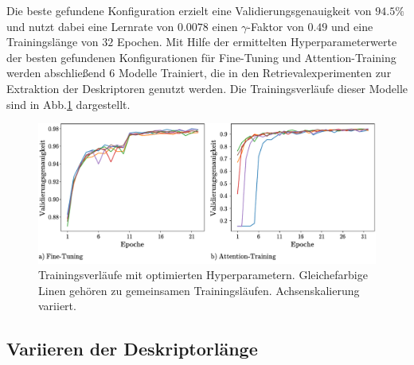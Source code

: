 Die beste gefundene Konfiguration erzielt eine Validierungsgenauigkeit von $94.5\%$ und nutzt dabei eine Lernrate von $0.0078$ einen $\gamma$-Faktor von $0.49$ und eine Trainingslänge von $32$ Epochen. 
Mit Hilfe der ermittelten Hyperparameterwerte der besten gefundenen Konfigurationen für Fine-Tuning und Attention-Training werden abschließend $6$ Modelle Trainiert, die in den Retrievalexperimenten zur Extraktion der Deskriptoren genutzt werden. Die Trainingsverläufe dieser Modelle sind in Abb.\ref{optimized_runs} dargestellt.
\begin{figure}[h]
\includegraphics[scale=0.75]{NNOPT/6_model_verlauf}
\caption{Trainingsverläufe mit optimierten Hyperparametern. Gleichefarbige Linen gehören zu gemeinsamen Trainingsläufen. Achsenskalierung variiert.}
\label{optimized_runs}
\end{figure}

\subsection{Variieren der Deskriptorlänge}\label{pca_experiments}

